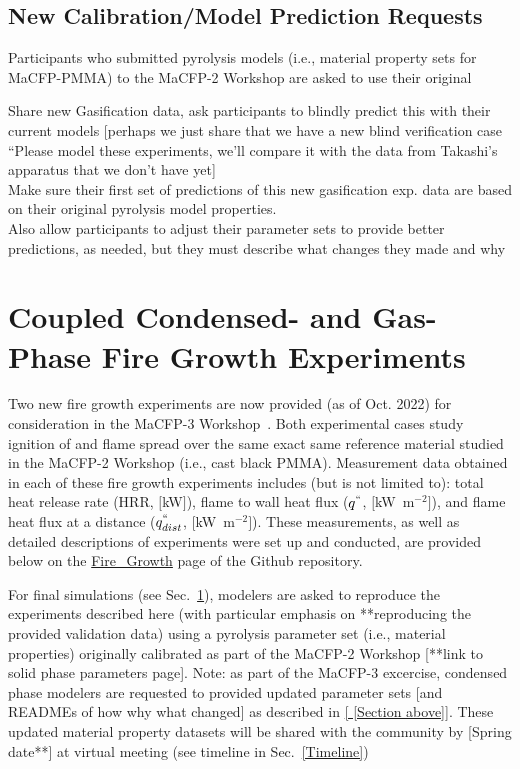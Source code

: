 \documentclass[12pt]{article}
\begin{document}
\subsection{New Calibration/Model Prediction Requests }
Participants who submitted pyrolysis models (i.e., material property sets for MaCFP-PMMA) to the MaCFP-2 Workshop are asked to use their original 

 Share new Gasification data, ask participants to blindly predict this with their current models [perhaps we just share that we have a new blind verification case “Please model these experiments, we’ll compare it with the data from Takashi’s apparatus that we don’t have yet]\\
Make sure their first set of predictions of this new gasification exp. data are based on their original pyrolysis model properties.\\
Also allow participants to adjust their parameter sets to provide better predictions, as needed, but they must describe what changes they made and why\\





\clearpage
\section{Coupled Condensed- and Gas-Phase Fire Growth Experiments}
Two new fire growth experiments are now provided (as of Oct. 2022) for consideration in the MaCFP-3 Workshop~\cite{chaudhari2021experimental, Leventon2022ParallelPanel}. Both experimental cases study ignition of and flame spread over the same exact same reference material studied in the MaCFP-2 Workshop (i.e., cast black PMMA). Measurement data obtained in each of these fire growth experiments includes (but is not limited to): total heat release rate (HRR, $[$kW$]$), flame to wall heat flux ($q^{``}$, $[$kW~m$^{-2}$$]$), and flame heat flux at a distance ($q^{``}_{dist}$, $[$kW~m$^{-2}$$]$). These measurements, as well as detailed descriptions of experiments were set up and conducted, are provided below on the \href{https://github.com/MaCFP/macfp-db/tree/master/Fire_Growth}{Fire\_Growth} page of the Github repository. 

For final simulations (see Sec.~\ref{}), modelers are asked to reproduce the experiments described here (with particular emphasis on **reproducing the provided validation data) using a pyrolysis parameter set (i.e., material properties) originally calibrated as part of the MaCFP-2 Workshop [**link to solid phase parameters page]. Note: as part of the MaCFP-3 excercise, condensed phase modelers are requested to provided updated parameter sets [and READMEs of how why what changed] as described in \ref{ [Section above]}. These updated material property datasets will be shared with the community by [Spring date**] at virtual meeting (see timeline in Sec.~\ref{Timeline})
\end{document}
